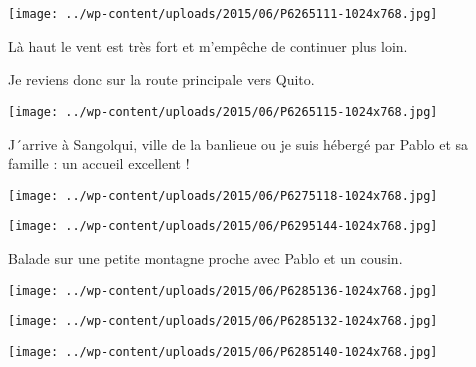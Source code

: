 \begin{center} \texttt{[image: ../wp-content/uploads/2015/06/P6265111-1024x768.jpg]} \end{center}

 

 Là haut le vent est très fort et m'empêche de continuer plus loin. 

 Je reviens donc sur la route principale vers Quito. 

 

\begin{center} \texttt{[image: ../wp-content/uploads/2015/06/P6265115-1024x768.jpg]} \end{center}

 

 J´arrive à Sangolqui, ville de la banlieue ou je suis hébergé par Pablo et sa famille : un accueil excellent ! 

 

\begin{center} \texttt{[image: ../wp-content/uploads/2015/06/P6275118-1024x768.jpg]} \end{center}

 

 

\begin{center} \texttt{[image: ../wp-content/uploads/2015/06/P6295144-1024x768.jpg]} \end{center}

 

 Balade sur une petite montagne proche avec Pablo et un cousin. 

 

\begin{center} \texttt{[image: ../wp-content/uploads/2015/06/P6285136-1024x768.jpg]} \end{center}

 

 

\begin{center} \texttt{[image: ../wp-content/uploads/2015/06/P6285132-1024x768.jpg]} \end{center}

 

 

\begin{center} \texttt{[image: ../wp-content/uploads/2015/06/P6285140-1024x768.jpg]} \end{center}

